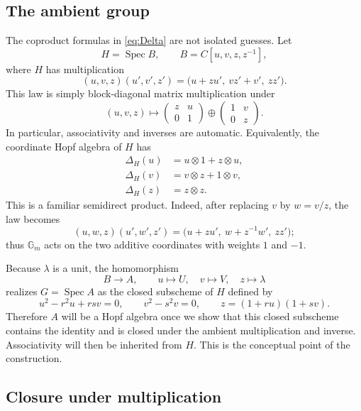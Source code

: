 \documentclass[11pt]{article}
\newcommand{\ot}{\otimes}
\newcommand{\Spec}{\operatorname{Spec}}
\theoremstyle{remark}
\begin{document}
\subsection*{The ambient group}

The coproduct formulas in \eqref{eq:Delta} are not isolated guesses.  Let
\[
 H=\Spec B,\qquad B=C[u,v,z,z^{-1}],
\]
where \(H\) has multiplication
\begin{equation}\label{eq:ambient-law}
 (u,v,z)(u',v',z')
 =\bigl(u+zu',\ vz'+v',\ zz'\bigr).
\end{equation}
This law is simply block-diagonal matrix multiplication under
\[
 (u,v,z)\longmapsto
 \begin{pmatrix}z&u\\0&1\end{pmatrix}
 \oplus
 \begin{pmatrix}1&v\\0&z\end{pmatrix}.
\]
In particular, associativity and inverses are automatic.
Equivalently, the coordinate Hopf algebra of \(H\) has
\begin{align*}
 \Delta_H(u)&=u\ot1+z\ot u,\\
 \Delta_H(v)&=v\ot z+1\ot v,\\
 \Delta_H(z)&=z\ot z.
\end{align*}
This is a familiar semidirect product.  Indeed, after replacing \(v\) by
\(w=v/z\), the law becomes
\[
 (u,w,z)(u',w',z')
 =\bigl(u+zu',\ w+z^{-1}w',\ zz'\bigr);
\]
thus \(\mathbb G_m\) acts on the two additive coordinates with weights
\(1\) and \(-1\).

Because \(\lambda\) is a unit, the homomorphism
\[
 B\longrightarrow A,\qquad
 u\longmapsto U,\quad v\longmapsto V,\quad z\longmapsto\lambda
\]
realizes \(G=\Spec A\) as the closed subscheme of \(H\) defined by
\begin{equation}\label{eq:ambient-ideal}
 u^2-r^2u+rsv=0,\qquad
 v^2-s^2v=0,\qquad
 z=(1+ru)(1+sv).
\end{equation}
Therefore \(A\) will be a Hopf algebra once we show that this closed
subscheme contains the identity and is closed under the ambient
multiplication and inverse.  Associativity will then be inherited from
\(H\).  This is the conceptual point of the construction.

\subsection*{Closure under multiplication}
\end{document}
